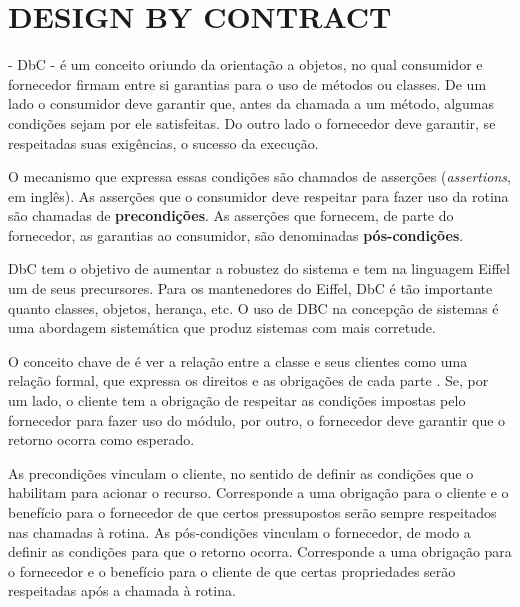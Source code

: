 
\section{DESIGN BY CONTRACT}
\label{Design-by-Contract}
\vspace{-6mm}

\designbycontract{} \cite{meyer1992applying} - DbC - é um conceito
oriundo da orientação a objetos, no qual consumidor e fornecedor firmam entre si garantias para
o uso de métodos ou classes. De um lado o consumidor deve garantir que, antes da
chamada a um método, algumas condições sejam por ele satisfeitas.
Do outro lado o fornecedor deve garantir, se respeitadas suas exigências,
o sucesso da execução.

O mecanismo que expressa essas condições são chamados de asserções
(\textit{assertions}, em inglês). As asserções que o consumidor deve respeitar
para fazer uso da rotina são chamadas de \textbf{precondições}. As asserções que
fornecem, de parte do fornecedor, as garantias ao consumidor, são denominadas
\textbf{pós-condições}.

DbC tem o objetivo de aumentar a robustez do sistema e tem na linguagem Eiffel
\cite{meyer1988eiffel} um de seus precursores. Para os mantenedores do Eiffel, DbC é
tão importante quanto classes, objetos, herança, etc. O uso de DBC na
concepção de sistemas é uma abordagem sistemática que produz sistemas com mais
corretude.

O conceito chave de \designbycontract{} é ver a relação entre a classe e
seus clientes como uma relação formal, que expressa os direitos e as
obrigações de cada parte \cite{meyer1997object}. Se, por um lado, o
cliente tem a obrigação de respeitar as condições impostas pelo fornecedor para fazer uso do módulo, por
outro, o fornecedor deve garantir que o retorno ocorra como esperado.

As precondições vinculam o cliente, no sentido de definir as condições que
o habilitam para acionar o recurso. Corresponde a uma obrigação para o cliente e
o benefício para o fornecedor \cite{meyer1997object} de que certos
pressupostos serão sempre respeitados nas chamadas à rotina.
As pós-condições vinculam o fornecedor, de modo a definir as condições para que o retorno ocorra.
Corresponde a uma obrigação para o fornecedor e o benefício para o cliente de
que certas propriedades serão respeitadas após a chamada à rotina.

